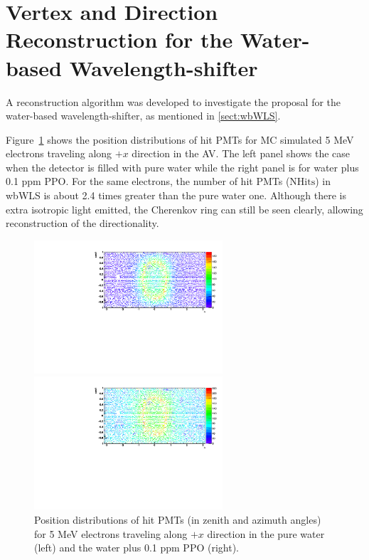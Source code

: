 \section{Vertex and Direction Reconstruction for the Water-based Wavelength-shifter}
A reconstruction algorithm was developed to investigate the proposal for the water-based wavelength-shifter, as mentioned in \ref{sect:wbWLS}.

Figure~\ref{pmt_wls} shows the position distributions of hit PMTs for MC simulated 5 MeV electrons traveling along $+x$ direction in the AV. The left panel shows the case when the detector is filled with pure water while the right panel is for water plus 0.1 ppm PPO. For the same electrons, the number of hit PMTs ($\mathrm{NHits}$) in wbWLS is about 2.4 times greater than the pure water one. Although there is extra isotropic light emitted, the Cherenkov ring can still be seen clearly, allowing reconstruction of the directionality.  

\begin{figure}[htbp]
	\centering
	\begin{minipage}[t]{0.48\textwidth}
		\centering
		\includegraphics[width=7cm]{PMT_5MeVElectronWater.pdf}
	\end{minipage}
	\begin{minipage}[t]{0.48\textwidth}
		\centering
		\includegraphics[width=7cm]{PMT_5MeVElectron0p1ppmPPO.pdf}
	\end{minipage}
	\caption{Position distributions of hit PMTs (in zenith and azimuth angles) for 5 MeV electrons traveling along $+x$ direction in the pure water (left) and the water plus 0.1 ppm PPO (right).}
	\label{pmt_wls}
\end{figure}

